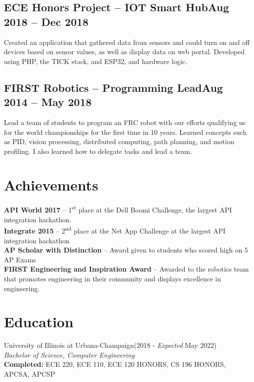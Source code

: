 \documentclass[letterpaper,11pt]{article}
\begin{document}
\subsection{ECE Honors Project -- IOT Smart Hub\null\hfill Aug 2018 -- Dec 2018}
Created an application that gathered data from sensors and could turn on and off devices based on sensor values, as well as display data on web portal.
Developed using PHP, the TICK stack, and ESP32, and hardware logic.
\vspace*{-2mm}
\subsection{FIRST Robotics -- Programming Lead\null\hfill Aug 2014 -- May 2018}
Lead a team of students to program an FRC robot with our efforts qualifying us for the world championships for the first time in 10 years.
Learned concepts such as PID, vision processing, distributed computing, path planning, and motion profiling.
I also learned how to delegate tasks and lead a team.
\vspace*{-2mm}
\section{Achievements}
{\bfseries API World 2017} -- 1\textsuperscript{st} place at the Dell Boomi Challenge, the largest API integration hackathon.\\
{\bfseries Integrate 2015} -- 2\textsuperscript{nd} place at the Net App Challenge at the largest API integration hackathon\\
{\bfseries AP Scholar with Distinction} -- Award given to students who scored high on 5 AP Exams\\
{\bfseries FIRST Engineering and Inspiration Award} -- Awarded to the robotics team that promotes engineering in their community and displays excellence in engineering.
\section{Education}
University of Illinois at Urbana-Champaign\null\hfill(2018 - \emph{Expected} May 2022)\\
\emph{Bachelor of Science, Computer Engineering}\\
{\bfseries Completed: }ECE 220, ECE 110, ECE 120 HONORS, CS 196 HONORS, APCSA, APCSP\\
\end{document}
